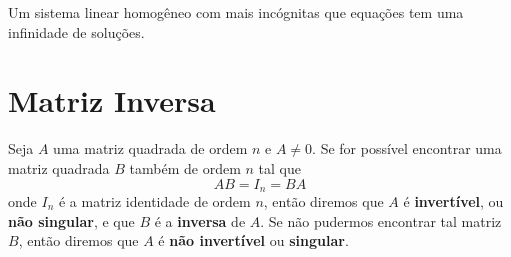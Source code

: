 \begin{teorema}
    Um sistema linear homogêneo com mais incógnitas que equações tem uma infinidade de soluções.
\end{teorema}

\section{Matriz Inversa}

\begin{definicao}
    Seja $A$ uma matriz quadrada de ordem $n$ e $A \ne 0$. Se for possível encontrar uma matriz quadrada $B$ também de
    ordem $n$ tal que
    \[
        AB = I_n = BA
    \]
    onde $I_n$ é a matriz identidade de ordem $n$, então diremos que $A$ é \textbf{invertível}, ou \textbf{não singular}, e que $B$ é a \textbf{inversa} de $A$. Se não pudermos encontrar tal matriz $B$, então diremos que $A$ é \textbf{não invertível} ou \textbf{singular}.
\end{definicao}

